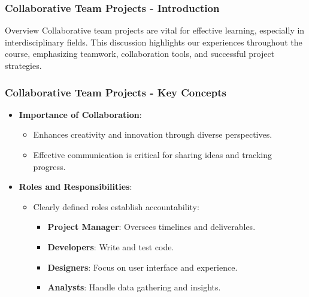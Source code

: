 \documentclass[aspectratio=169]{beamer}
\begin{document}
\begin{frame}[fragile]
    \frametitle{Collaborative Team Projects - Introduction}
    \begin{block}{Overview}
        Collaborative team projects are vital for effective learning, especially in interdisciplinary fields. 
        This discussion highlights our experiences throughout the course, emphasizing teamwork, collaboration tools, 
        and successful project strategies.
    \end{block}
\end{frame}

\begin{frame}[fragile]
    \frametitle{Collaborative Team Projects - Key Concepts}
    \begin{itemize}
        \item \textbf{Importance of Collaboration}:
        \begin{itemize}
            \item Enhances creativity and innovation through diverse perspectives.
            \item Effective communication is critical for sharing ideas and tracking progress.
        \end{itemize}

        \item \textbf{Roles and Responsibilities}:
        \begin{itemize}
            \item Clearly defined roles establish accountability:
            \begin{itemize}
                \item \textbf{Project Manager}: Oversees timelines and deliverables.
                \item \textbf{Developers}: Write and test code.
                \item \textbf{Designers}: Focus on user interface and experience.
                \item \textbf{Analysts}: Handle data gathering and insights.
            \end{itemize}
        \end{itemize}
    \end{itemize}
\end{frame}
\end{document}
